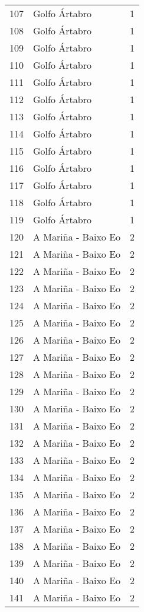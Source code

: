 \begin{table}[p]
\begin{tabular}{rlr}
  107 & Golfo Ártabro &   1 \\ 
  108 & Golfo Ártabro &   1 \\ 
  109 & Golfo Ártabro &   1 \\ 
  110 & Golfo Ártabro &   1 \\ 
  111 & Golfo Ártabro &   1 \\ 
  112 & Golfo Ártabro &   1 \\ 
  113 & Golfo Ártabro &   1 \\ 
  114 & Golfo Ártabro &   1 \\ 
  115 & Golfo Ártabro &   1 \\ 
  116 & Golfo Ártabro &   1 \\ 
  117 & Golfo Ártabro &   1 \\ 
  118 & Golfo Ártabro &   1 \\ 
  119 & Golfo Ártabro &   1 \\ 
  120 & A Mariña - Baixo Eo &   2 \\ 
  121 & A Mariña - Baixo Eo &   2 \\ 
  122 & A Mariña - Baixo Eo &   2 \\ 
  123 & A Mariña - Baixo Eo &   2 \\ 
  124 & A Mariña - Baixo Eo &   2 \\ 
  125 & A Mariña - Baixo Eo &   2 \\ 
  126 & A Mariña - Baixo Eo &   2 \\ 
  127 & A Mariña - Baixo Eo &   2 \\ 
  128 & A Mariña - Baixo Eo &   2 \\ 
  129 & A Mariña - Baixo Eo &   2 \\ 
  130 & A Mariña - Baixo Eo &   2 \\ 
  131 & A Mariña - Baixo Eo &   2 \\ 
  132 & A Mariña - Baixo Eo &   2 \\ 
  133 & A Mariña - Baixo Eo &   2 \\ 
  134 & A Mariña - Baixo Eo &   2 \\ 
  135 & A Mariña - Baixo Eo &   2 \\ 
  136 & A Mariña - Baixo Eo &   2 \\ 
  137 & A Mariña - Baixo Eo &   2 \\ 
  138 & A Mariña - Baixo Eo &   2 \\ 
  139 & A Mariña - Baixo Eo &   2 \\ 
  140 & A Mariña - Baixo Eo &   2 \\ 
  141 & A Mariña - Baixo Eo &   2 \\ 

\end{tabular}
\end{table}
